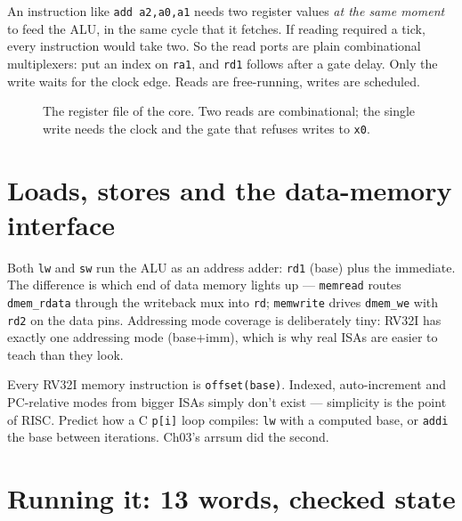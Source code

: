 \begin{principle}
An instruction like \texttt{add a2,a0,a1} needs two register values
\emph{at the same moment} to feed the ALU, in the same cycle that it
fetches. If reading required a tick, every instruction would take two.
So the read ports are plain combinational multiplexers: put an index on
\texttt{ra1}, and \texttt{rd1} follows after a gate delay. Only the
write waits for the clock edge. Reads are free-running, writes are
scheduled.
\end{principle}

\begin{figure}[t]
\centering

\caption[Register file]{The register file of the core. Two reads are
combinational; the single write needs the clock and the gate that
refuses writes to \texttt{x0}.}
\label{fig:regfile05}
\end{figure}

\section{Loads, stores and the data-memory interface}
\label{sec:mem05}

Both \texttt{lw} and \texttt{sw} run the ALU as an address adder:
\texttt{rd1} (base) plus the immediate. The difference is which end
of data memory lights up --- \texttt{memread} routes
\texttt{dmem\_rdata} through the writeback mux into \texttt{rd};
\texttt{memwrite} drives \texttt{dmem\_we} with \texttt{rd2} on the
data pins. Addressing mode coverage is deliberately tiny: RV32I has
exactly one addressing mode (base+imm), which is why real ISAs are
easier to teach than they look.

\begin{checkpoint}\label{cp:addr05}
Every RV32I memory instruction is \texttt{offset(base)}. Indexed,
auto-increment and PC-relative modes from bigger ISAs simply don't
exist --- simplicity is the point of RISC. Predict how a C
\texttt{p[i]} loop compiles: \texttt{lw} with a computed base, or
\texttt{addi} the base between iterations. Ch03's arrsum did the
second.
\end{checkpoint}

\section{Running it: 13 words, checked state}
\label{sec:run05}

